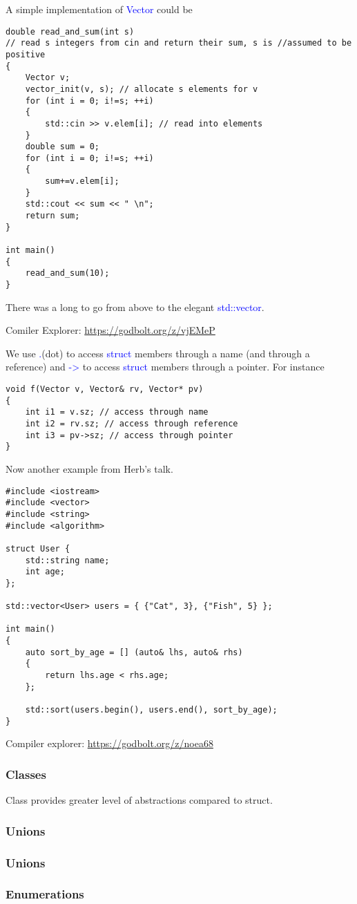 \documentclass{article}
\newcommand{\blue}[1]{\textcolor{blue}{#1}}
\begin{document}
A simple implementation of \blue{Vector} could be 
\begin{verbatim}
double read_and_sum(int s)
// read s integers from cin and return their sum, s is //assumed to be positive
{
    Vector v;
    vector_init(v, s); // allocate s elements for v
    for (int i = 0; i!=s; ++i)
    {
        std::cin >> v.elem[i]; // read into elements
    }
    double sum = 0;
    for (int i = 0; i!=s; ++i)
    {
        sum+=v.elem[i];
    }
    std::cout << sum << " \n";
    return sum;
}

int main()
{
    read_and_sum(10);
}	
\end{verbatim}
There was a long to go from above to the elegant \blue{std::vector}.

Comiler Explorer: \url{https://godbolt.org/z/vjEMeP}

We use \blue{.}(dot) to access \blue{struct} members through a name (and through a reference) and \blue{->} to access 
\blue{struct} members through a pointer. For instance

\begin{verbatim}
void f(Vector v, Vector& rv, Vector* pv)
{
    int i1 = v.sz; // access through name
    int i2 = rv.sz; // access through reference
    int i3 = pv->sz; // access through pointer
}
\end{verbatim}


Now another example from Herb's talk.
\begin{verbatim}
#include <iostream>
#include <vector>
#include <string>
#include <algorithm>

struct User {
    std::string name;
    int age;
};

std::vector<User> users = { {"Cat", 3}, {"Fish", 5} };

int main()
{
    auto sort_by_age = [] (auto& lhs, auto& rhs)
    {
        return lhs.age < rhs.age;
    };

    std::sort(users.begin(), users.end(), sort_by_age);
}
\end{verbatim}
Compiler explorer: \url{https://godbolt.org/z/noea68}

\subsubsection{Classes}
Class provides greater level of abstractions compared to struct.
\subsubsection{Unions}

\subsubsection{Unions}

\subsubsection{Enumerations}
%
\end{document}
